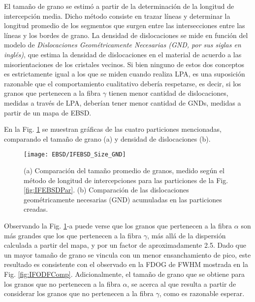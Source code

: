 El tamaño de grano se estimó a partir de la determinación de la longitud de intercepción media.
Dicho método consiste en trazar líneas y determinar la longitud promedio de los segmentos que surgen entre las intersecciones entre las líneas y los bordes de grano.
La densidad de dislocaciones se mide en función del modelo de \textit{Dislocaciones Geométricamente Necesarias (GND, por sus siglas en inglés)}\cite{Pantleon2008}, que estima la densidad de dislocaciones en el material de acuerdo a las misorientaciones de los cristales vecinos.
Si bien ninguno de estos dos conceptos es estrictamente igual a los que se miden cuando realiza LPA, es una suposición razonable que el comportamiento cualitativo debería respetarse, es decir, si los granos que pertenecen a la fibra $\gamma$ tienen menor cantidad de dislocaciones, medidas a través de LPA, deberían tener menor cantidad de GNDs, medidas a partir de un mapa de EBSD.

En la Fig. \ref{fig:IFEBSDVs} se muestran gráficas de las cuatro particiones mencionadas, comparando el tamaño de grano (a) y densidad de dislocaciones (b).

\begin{figure}[!htb]
  \centering
  \texttt{[image: EBSD/IFEBSD\_Size\_GND]}
  \caption{(a) Comparación del tamaño promedio de granos, medido según el método de longitud de intercepciones para las particiones de la Fig. \ref{fig:IFEBSDPar}. (b) Comparación de las dislocaciones geométricamente necesarias (GND) acumuladas en las particiones creadas.}
  \label{fig:IFEBSDVs}
\end{figure}

Observando la Fig. \ref{fig:IFEBSDVs}-a puede verse que los granos que pertenecen a la fibra $\alpha$ son más grandes que los que pertenecen a la fibra $\gamma$, más allá de la dispersión calculada a partir del mapa, y por un factor de aproximadamente 2.5.
Dado que un mayor tamaño de grano se vincula con un menor ensanchamiento de pico, este resultado es consistente con el observado en la FDOG de FWHM mostrada en la Fig. \ref{fig:IFODFComp}.
Adicionalmente, el tamaño de grano que se obtiene para los granos que no pertenecen a la fibra $\alpha$, se acerca al que resulta a partir de considerar los granos que no pertenecen a la fibra $\gamma$, como es razonable esperar.

